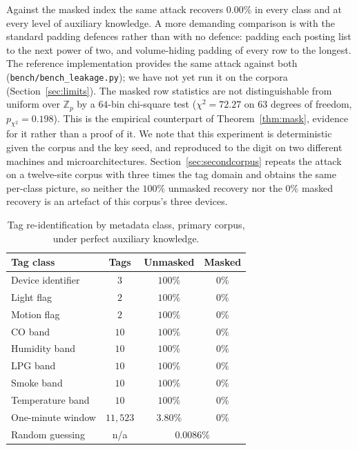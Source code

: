 \documentclass[a4paper,fleqn]{cas-sc}
\newif\ifauthorchecks
\newcommand{\authorcheck}[1]{\ifauthorchecks{\color{red}\textsf{[Authors: #1]}}\fi}
\begin{document}
Against the masked index the same attack recovers $0.00\%$ in every class and
at every level of auxiliary knowledge. A more demanding comparison is with
the standard padding defences rather than with no defence: padding each
posting list to the next power of two, and volume-hiding padding of every
row to the longest. The reference implementation provides the same attack
against both (\texttt{bench/bench\_leakage.py}); we have not yet run it on the
corpora (Section~\ref{sec:limits}).
\authorcheck{Run bench/bench\_leakage.py on both corpora and add the padded
and volume-hiding columns to Table~\ref{tab:leakage}; the raw files could not
be fetched where the reference results were produced.} The masked row statistics are not
distinguishable from uniform over $\mathbb{Z}_p$ by a $64$-bin chi-square test
($\chi^2=72.27$ on $63$ degrees of freedom, $p_{\chi^2}=0.198$). This is the
empirical counterpart of Theorem~\ref{thm:mask}, evidence for it rather than a
proof of it. We note that this experiment is deterministic given the corpus
and the key seed, and reproduced to the digit on two different machines and
microarchitectures. Section~\ref{sec:secondcorpus} repeats the attack on a
twelve-site corpus with three times the tag domain and obtains the same
per-class picture, so neither the $100\%$
unmasked recovery nor the $0\%$ masked recovery is an artefact of this
corpus's three devices.

\begin{table}[pos=htbp]
\caption{Tag re-identification by metadata class, primary corpus, under
perfect auxiliary knowledge.}
\label{tab:leakage}
\centering
\footnotesize
\setlength{\tabcolsep}{3pt}
\renewcommand{\arraystretch}{1.15}
\begin{tabular*}{\tblwidth}{@{\extracolsep{\fill}}lccc@{}}
\toprule
Tag class & Tags & Unmasked & Masked \\
\midrule
Device identifier      & $3$      & $100\%$ & $0\%$ \\
Light flag             & $2$      & $100\%$ & $0\%$ \\
Motion flag            & $2$      & $100\%$ & $0\%$ \\
CO band                & $10$     & $100\%$ & $0\%$ \\
Humidity band          & $10$     & $100\%$ & $0\%$ \\
LPG band               & $10$     & $100\%$ & $0\%$ \\
Smoke band             & $10$     & $100\%$ & $0\%$ \\
Temperature band       & $10$     & $100\%$ & $0\%$ \\
One-minute window      & $11{,}523$ & $3.80\%$ & $0\%$ \\
\midrule
Random guessing        & n/a      & \multicolumn{2}{c}{$0.0086\%$} \\
\bottomrule
\end{tabular*}
\end{table}
\end{document}
